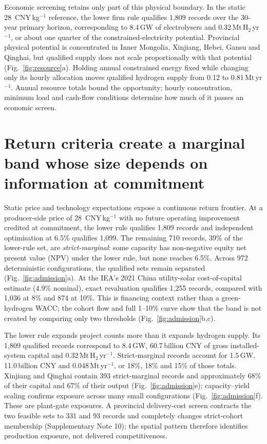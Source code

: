 \documentclass[lineno,pdflatex,sn-nature]{sn-jnl}
\newcommand{\cnykg}{CNY\,kg$^{-1}$}
\begin{document}
Economic screening retains only part of this physical boundary. In the static 28~\cnykg{} reference, the lower firm rule qualifies 1,809 records over the 30-year primary horizon, corresponding to 8.4\,GW of electrolysers and 0.32\,Mt\,H$_2$\,yr$^{-1}$, or about one quarter of the constrained-electricity potential. Provincial physical potential is concentrated in Inner Mongolia, Xinjiang, Hebei, Gansu and Qinghai, but qualified supply does not scale proportionally with that potential (Fig.~\ref{fig:resource}a). Holding annual constrained energy fixed while changing only its hourly allocation moves qualified hydrogen supply from 0.12 to 0.81\,Mt\,yr$^{-1}$. Annual resource totals bound the opportunity; hourly concentration, minimum load and cash-flow conditions determine how much of it passes an economic screen.

\section*{Return criteria create a marginal band whose size depends on information at commitment}

Static price and technology expectations expose a continuous return frontier. At a producer-side price of 28~\cnykg{} with no future operating improvement credited at commitment, the lower rule qualifies 1,809 records and independent optimisation at 6.5\% qualifies 1,099. The remaining 710 records, 39\% of the lower-rule set, are \emph{strict-marginal}: some capacity has non-negative equity net present value (NPV) under the lower rule, but none reaches 6.5\%. Across 972 deterministic configurations, the qualified sets remain separated (Fig.~\ref{fig:admission}a). At the IEA's 2021 China utility-solar cost-of-capital estimate (4.9\% nominal), exact revaluation qualifies 1,255 records, compared with 1,036 at 8\% and 874 at 10\%\cite{ieacapital}. This is financing context rather than a green-hydrogen WACC; the cohort flow and full 1--10\% curve show that the band is not created by comparing only two thresholds (Fig.~\ref{fig:admission}b,c).

The lower rule expands project counts more than it expands hydrogen supply. Its 1,809 qualified records correspond to 8.4\,GW, 60.7\,billion CNY of gross installed-system capital and 0.32\,Mt\,H$_2$\,yr$^{-1}$. Strict-marginal records account for 1.5\,GW, 11.0\,billion CNY and 0.048\,Mt\,yr$^{-1}$, or 18\%, 18\% and 15\% of those totals. Xinjiang and Qinghai contain 393 strict-marginal records and approximately 68\% of their capital and 67\% of their output (Fig.~\ref{fig:admission}e); capacity--yield scaling confirms exposure across many small configurations (Fig.~\ref{fig:admission}f). These are plant-gate exposures. A provincial delivery-cost screen\cite{bi2026} contracts the two feasible sets to 331 and 93 records and completely changes strict-cohort membership (Supplementary Note 10); the spatial pattern therefore identifies production exposure, not delivered competitiveness.
\end{document}
